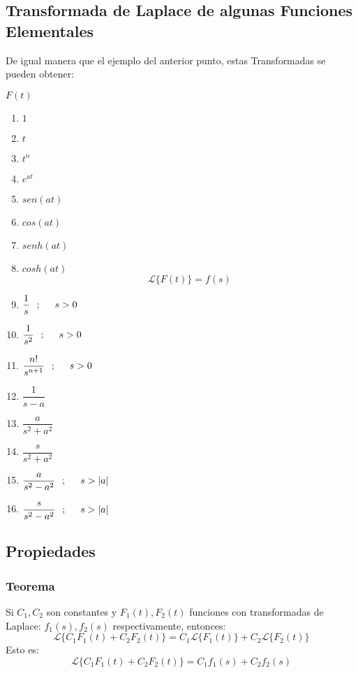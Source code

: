 \subsection*{Transformada de Laplace de algunas Funciones Elementales}
De igual manera que el ejemplo del anterior punto, estas Transformadas se pueden obtener:
\begin{multicols}{2}
\begin{center}
$F(t)$
\end{center}
\begin{enumerate}[1)]
\item $1$
\item $t$ 
\item $t^n$
\item $e^{at}$
\item $sen(at)$
\item $cos(at)$
\item $senh(at)$
\item $cosh(at)$
\columnbreak
$$\mathscr{L} \lbrace F(t) \rbrace=f(s)$$
\item[] $\dfrac{1}{s} \hspace{0.25cm};\hspace{0.5cm}s>0$
\item[] $\dfrac{1}{s^2} \hspace{0.25cm};\hspace{0.5cm}s>0$
\item[] $\dfrac{n!}{s^{n+1}} \hspace{0.25cm};\hspace{0.5cm}s>0$
\item[] $\dfrac{1}{s-a}$
\item[] $\dfrac{a}{s^2+a^2}$
\item[] $\dfrac{s}{s^2+a^2}$
\item[] $\dfrac{a}{s^2-a^2} \hspace{0.25cm};\hspace{0.5cm}s>|a|$
\item[] $\dfrac{s}{s^2-a^2} \hspace{0.25cm};\hspace{0.5cm}s>|a|$
\end{enumerate}
\end{multicols}
\subsection*{Propiedades}
\subsubsection*{Teorema}
Si $C_1,C_2$ son constantes y $F_1(t),F_2(t)$ funciones con transformadas de Laplace: $f_1(s),f_2(s)$ respectivamente, entonces:
$$\mathscr{L} \lbrace C_1 F_1(t)+C_2 F_2(t) \rbrace = C_1\mathscr{L}\lbrace F_1(t)\rbrace + C_2\mathscr{L}\lbrace F_2(t)\rbrace$$
Esto es:
$$\mathscr{L} \lbrace C_1 F_1(t)+C_2 F_2(t) \rbrace = C_1 f_1(s) +  C_2 f_2(s)$$
